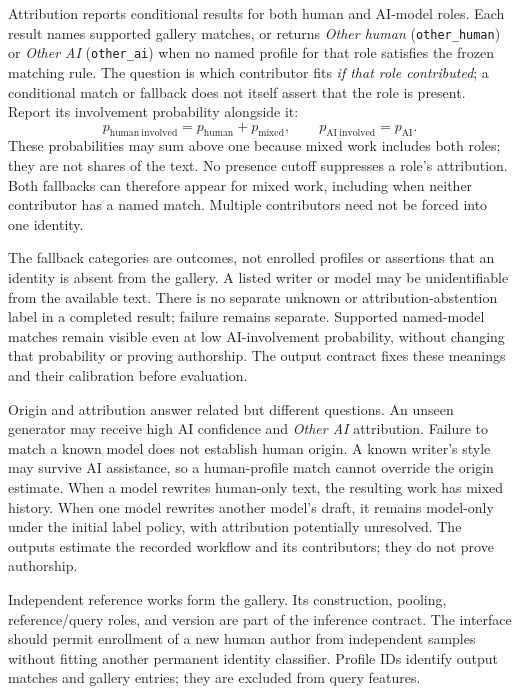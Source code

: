 Attribution reports conditional results for both human and AI-model roles.
Each result names supported gallery matches, or returns \emph{Other human}
(\texttt{other\_human}) or \emph{Other AI} (\texttt{other\_ai}) when no named
profile for that role satisfies the frozen matching rule. The question is
which contributor fits \emph{if that role contributed}; a conditional match or
fallback does not itself assert that the role is present. Report its involvement
probability alongside it:
\[
 p_{\mathrm{human\ involved}}=p_{\mathrm{human}}+p_{\mathrm{mixed}},
 \qquad p_{\mathrm{AI\ involved}}=p_{\mathrm{AI}}.
\]
These probabilities may sum above one because mixed work includes both roles;
they are not shares of the text. No presence cutoff suppresses a role's
attribution. Both fallbacks can therefore appear for mixed work, including
when neither contributor has a named match. Multiple contributors need not
be forced into one identity.

The fallback categories are outcomes, not enrolled profiles or assertions
that an identity is absent from the gallery. A listed writer or model may be
unidentifiable from the available text. There is no separate unknown or
attribution-abstention label in a completed result; failure remains separate.
Supported named-model matches remain visible even at low AI-involvement
probability, without changing that probability or proving authorship.
The output contract fixes these meanings and their calibration before evaluation.

Origin and attribution answer related but different questions. An unseen generator
may receive high AI confidence and \emph{Other AI} attribution. Failure to match a
known model does not establish human origin. A known writer's style may survive
AI assistance, so a human-profile match cannot override the origin estimate.
When a model rewrites human-only text, the resulting work has mixed history.
When one model rewrites another model's draft, it remains model-only under the
initial label policy, with attribution potentially unresolved. The outputs
estimate the recorded workflow and its contributors; they do not prove authorship.

Independent reference works form the gallery. Its construction, pooling,
reference/query roles, and version are part of the inference contract. The
interface should permit enrollment of a new human author from independent
samples without fitting another permanent identity classifier. Profile IDs
identify output matches and gallery entries; they are excluded from query
features.

